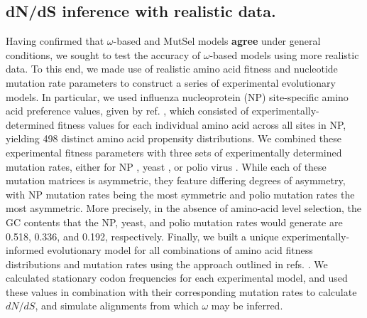 \documentclass{pnastwo}
\begin{document}
\begin{article}
\subsection*{dN/dS inference with realistic data.}
Having confirmed that $\omega$-based and MutSel models \textbf{agree} under general conditions, we sought to test the accuracy of $\omega$-based models using more realistic data. To this end, we made use of realistic amino acid fitness and nucleotide mutation rate parameters to construct a series of experimental evolutionary models. In particular, we used influenza nucleoprotein (NP) site-specific amino acid preference values, given by ref. \cite{Bloom2014a}, which consisted of experimentally-determined fitness values for each individual amino acid across all sites in NP, yielding 498 distinct amino acid propensity distributions. We combined these experimental fitness parameters with three sets of experimentally determined mutation rates, either for NP \cite{Bloom2014a}, yeast \cite{Zhu2014}, or polio virus \cite{Acevedo2014}. While each of these mutation matrices is asymmetric, they feature differing degrees of asymmetry, with NP mutation rates being the most symmetric and polio mutation rates the most asymmetric. More precisely, in the absence of amino-acid level selection, the GC contents that the NP, yeast, and polio mutation rates would generate are 0.518, 0.336, and 0.192, respectively. Finally, we built a unique experimentally-informed evolutionary model for all combinations of amino acid fitness distributions and mutation rates using the approach outlined in refs. \cite{Bloom2014a,Bloom2014b}. We calculated stationary codon frequencies for each experimental model, and used these values in combination with their corresponding mutation rates to calculate $dN/dS$, and simulate alignments from which $\omega$ may be inferred.


\end{article}
\end{document}
